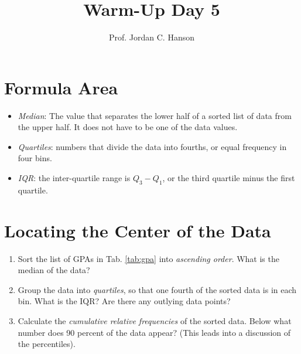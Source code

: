 \documentclass{article}
\begin{document}
\title{Warm-Up Day 5}
\author{Prof. Jordan C. Hanson}

\maketitle

\section{Formula Area}

\begin{itemize}
\item \textit{Median}: The value that separates the lower half of a sorted list of data from the upper half.  It does not have to be one of the data values.
\item \textit{Quartiles}: numbers that divide the data into fourths, or equal frequency in four bins.
\item \textit{IQR}: the inter-quartile range is $Q_3 - Q_1$, or the third quartile minus the first quartile.
\end{itemize}

\section{Locating the Center of the Data}

\begin{enumerate}
\item Sort the list of GPAs in Tab. \ref{tab:gpa} into \textit{ascending order}. What is the median of the data? \\ \vspace{2cm}
\item Group the data into \textit{quartiles}, so that one fourth of the sorted data is in each bin.  What is the IQR?  Are there any outlying data points? \\ \vspace{2cm}
\item Calculate the \textit{cumulative relative frequencies} of the sorted data.  Below what number does 90 percent of the data appear? (This leads into a discussion of the percentiles).
\end{enumerate}
\end{document}
